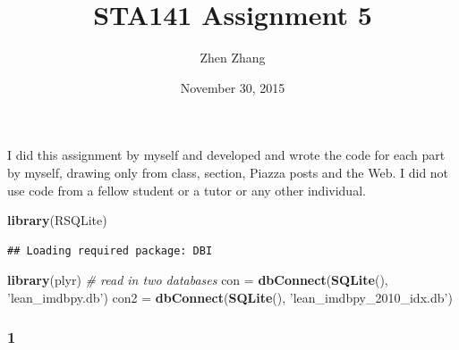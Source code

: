 \documentclass[]{article}
\title{STA141 Assignment 5}
\author{Zhen Zhang}
\date{November 30, 2015}
\newenvironment{Shaded}{\begin{snugshade}}{\end{snugshade}}
\newcommand{\KeywordTok}[1]{\textcolor[rgb]{0.13,0.29,0.53}{\textbf{{#1}}}}
\newcommand{\StringTok}[1]{\textcolor[rgb]{0.31,0.60,0.02}{{#1}}}
\newcommand{\CommentTok}[1]{\textcolor[rgb]{0.56,0.35,0.01}{\textit{{#1}}}}
\newcommand{\NormalTok}[1]{{#1}}
\begin{document}
\maketitle

I did this assignment by myself and developed and wrote the code for
each part by myself, drawing only from class, section, Piazza posts and
the Web. I did not use code from a fellow student or a tutor or any
other individual.

\begin{Shaded}
\begin{Highlighting}[]
\KeywordTok{library}\NormalTok{(RSQLite)}
\end{Highlighting}
\end{Shaded}

\begin{verbatim}
## Loading required package: DBI
\end{verbatim}

\begin{Shaded}
\begin{Highlighting}[]
\KeywordTok{library}\NormalTok{(plyr)}
\CommentTok{# read in two databases}
\NormalTok{con =}\StringTok{ }\KeywordTok{dbConnect}\NormalTok{(}\KeywordTok{SQLite}\NormalTok{(), }\StringTok{'lean_imdbpy.db'}\NormalTok{)}
\NormalTok{con2 =}\StringTok{ }\KeywordTok{dbConnect}\NormalTok{(}\KeywordTok{SQLite}\NormalTok{(), }\StringTok{'lean_imdbpy_2010_idx.db'}\NormalTok{)}
\end{Highlighting}
\end{Shaded}

\subsubsection{1}\label{section}
\end{document}
